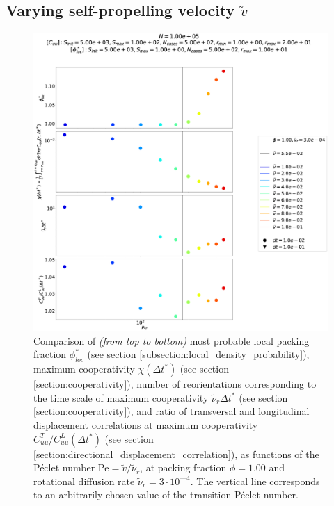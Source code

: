\documentclass[class=report, float=false, crop=false]{standalone}
\begin{document}
\subsection{Varying self-propelling velocity $\tilde{v}$}
\vfill
\begin{figure}[h!]
\centering
\includegraphics[width=\textwidth]{figures/figs/comparison_Dl1000_Rh3000_drdt.eps}
\caption{Comparison of \textit{(from top to bottom)} most probable local packing fraction $\phi_{loc}^*$ (see section \ref{subsection:local_density_probability}), maximum cooperativity $\chi(\Delta t^*)$ (see section \ref{section:cooperativity}), number of reorientations corresponding to the time scale of maximum cooperativity $\tilde{\nu}_r\Delta t^*$ (see section \ref{section:cooperativity}), and ratio of transversal and longitudinal displacement correlations at maximum cooperativity $C_{uu}^T/C_{uu}^L(\Delta t^*)$ (see section \ref{section:directional_displacement_correlation}), as functions of the P\'eclet number $\text{Pe} = \tilde{v}/\tilde{\nu}_r$, at packing fraction $\phi = 1.00$ and rotational diffusion rate $\tilde{\nu}_r = 3\cdot10^{—4}$. The vertical line corresponds to an arbitrarily chosen value of the transition P\'eclet number.}
\label{comparison_Dl1000_Rh3000}
\end{figure}
\vfill
\end{document}
